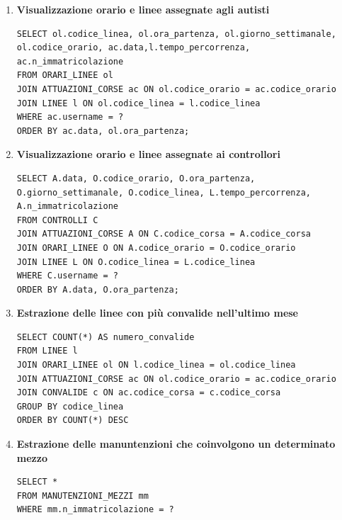 \documentclass[12pt,a4paper]{report}
\begin{document}
\begin{enumerate}[label=\textbf{\arabic*)}]
\item \textbf{Visualizzazione orario e linee assegnate agli autisti} \\
\begin{lstlisting}[style=sqlstyle, caption=Query for Corse Attuate by User]
SELECT ol.codice_linea, ol.ora_partenza, ol.giorno_settimanale, ol.codice_orario, ac.data,l.tempo_percorrenza, ac.n_immatricolazione
FROM ORARI_LINEE ol
JOIN ATTUAZIONI_CORSE ac ON ol.codice_orario = ac.codice_orario
JOIN LINEE l ON ol.codice_linea = l.codice_linea
WHERE ac.username = ?
ORDER BY ac.data, ol.ora_partenza;
\end{lstlisting}

\item \textbf{Visualizzazione orario e linee assegnate ai controllori} \\
\begin{lstlisting}[style=sqlstyle]
SELECT A.data, O.codice_orario, O.ora_partenza, O.giorno_settimanale, O.codice_linea, L.tempo_percorrenza, A.n_immatricolazione
FROM CONTROLLI C
JOIN ATTUAZIONI_CORSE A ON C.codice_corsa = A.codice_corsa
JOIN ORARI_LINEE O ON A.codice_orario = O.codice_orario
JOIN LINEE L ON O.codice_linea = L.codice_linea
WHERE C.username = ?
ORDER BY A.data, O.ora_partenza;
\end{lstlisting}

\item \textbf{Estrazione delle linee con più convalide nell’ultimo mese} \\
\begin{lstlisting}[style=sqlstyle, caption=Query for Number of Validations per Linea]
SELECT COUNT(*) AS numero_convalide
FROM LINEE l
JOIN ORARI_LINEE ol ON l.codice_linea = ol.codice_linea
JOIN ATTUAZIONI_CORSE ac ON ol.codice_orario = ac.codice_orario
JOIN CONVALIDE c ON ac.codice_corsa = c.codice_corsa
GROUP BY codice_linea
ORDER BY COUNT(*) DESC
\end{lstlisting}

\item \textbf{Estrazione delle manuntenzioni che coinvolgono un determinato mezzo} \\
\begin{lstlisting}[style=sqlstyle]
SELECT *
FROM MANUTENZIONI_MEZZI mm
WHERE mm.n_immatricolazione = ?
\end{lstlisting}


\end{enumerate}
\end{document}
